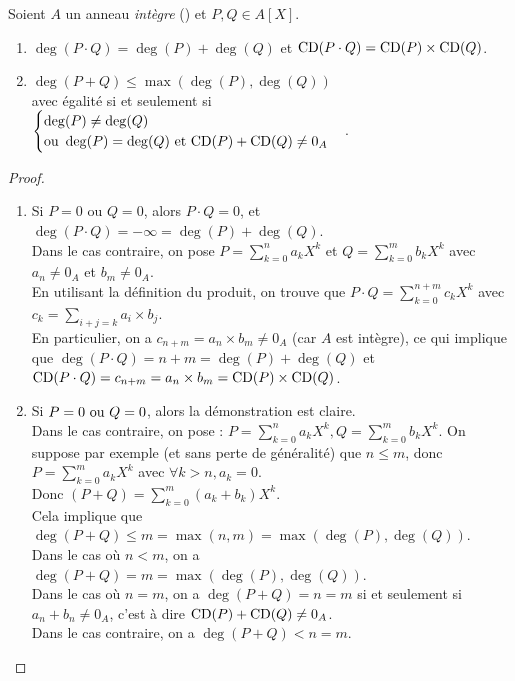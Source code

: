 \documentclass[12pt, a4paper]{report}
\begin{document}
\begin{property}
    Soient $A$ un anneau \textit{intègre} () et $P,Q \in A[X]$.

    \begin{enumerate}
        \item $\deg(P\cdot Q) = \deg(P) + \deg(Q)$ et $\mathrm{CD}(P\cdot Q) = \mathrm{CD}(P) \times \mathrm{CD}(Q)$.
        \item $\deg(P+Q) \le \max(\deg(P), \deg(Q))$\\avec égalité si et seulement si $\begin{cases} \deg(P) \ne \deg(Q)\\ \text{ou } \deg(P) = \deg(Q) \text{ et } \mathrm{CD}(P) + \mathrm{CD}(Q) \ne 0_A\end{cases}$.
    \end{enumerate}
\end{property}

\begin{proof}
    \begin{enumerate}
        \item Si $P=0$ ou $Q=0$, alors $P\cdot Q = 0$, et $\deg(P\cdot Q) = -\infty = \deg(P) + \deg(Q)$.\\Dans le cas contraire, on pose $P = \sum_{k=0}^{n}a_k X^k$ et $Q = \sum_{k=0}^{m}b_k X^k$ avec $a_n \ne 0_A$ et $b_m \ne 0_A$.\\En utilisant la définition du produit, on trouve que $P\cdot Q = \sum_{k=0}^{n+m}c_k X^k$ avec $c_{k} = \sum_{i+j=k} a_i \times b_j$.\\En particulier, on a $c_{n+m} = a_n \times b_m \ne 0_A$ (car $A$ est intègre), ce qui implique que $\deg(P\cdot Q) = n+m = \deg(P) + \deg(Q)$ et $\mathrm{CD}(P\cdot Q) = c_{n+m} = a_n \times b_m = \mathrm{CD}(P) \times \mathrm{CD}(Q)$.
        \item Si $P = 0 \text{ ou } Q= 0$, alors la démonstration est claire.\\Dans le cas contraire, on pose : $P=\sum_{k=0}^{n}a_kX^k, Q = \sum_{k=0}^{m}b_kX^k$. On suppose par exemple (et sans perte de généralité) que $n \le m$, donc $P = \sum_{k=0}^{m}a_kX^k$ avec $\forall k > n, a_k = 0$.\\Donc $(P+Q) = \sum_{k=0}^{m}(a_k+b_k)X^k$.\\Cela implique que $\deg(P+Q) \le m = \max(n,m) = \max(\deg(P), \deg(Q))$.\\Dans le cas où $n < m$, on a $\deg(P+Q) = m = \max(\deg(P), \deg(Q))$.\\Dans le cas où $n = m$, on a $\deg(P+Q) = n = m$ si et seulement si $a_n + b_n \ne 0_A$, c'est à dire $\mathrm{CD}(P) + \mathrm{CD}(Q) \ne 0_A$.\\Dans le cas contraire, on a $\deg(P+Q) < n = m$.
    \end{enumerate}
\end{proof}
\end{document}
